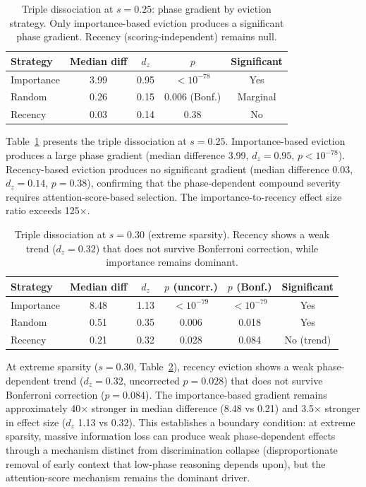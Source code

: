 \documentclass[11pt,a4paper]{article}
\begin{document}
\begin{table}[t]
\centering
\caption{Triple dissociation at $s=0.25$: phase gradient by eviction strategy. Only importance-based eviction produces a significant phase gradient. Recency (scoring-independent) remains null.}
\label{tab:triple_s025}
\begin{tabular}{lcccc}
\toprule
Strategy & Median diff & $d_z$ & $p$ & Significant \\
\midrule
Importance & 3.99 & 0.95 & $<10^{-78}$ & Yes \\
Random & 0.26 & 0.15 & 0.006 (Bonf.) & Marginal \\
Recency & 0.03 & 0.14 & 0.38 & No \\
\bottomrule
\end{tabular}
\end{table}

Table~\ref{tab:triple_s025} presents the triple dissociation at $s=0.25$. Importance-based eviction produces a large phase gradient (median difference 3.99, $d_z=0.95$, $p<10^{-78}$). Recency-based eviction produces no significant gradient (median difference 0.03, $d_z=0.14$, $p=0.38$), confirming that the phase-dependent compound severity requires attention-score-based selection. The importance-to-recency effect size ratio exceeds 125$\times$.

\begin{table}[t]
\centering
\caption{Triple dissociation at $s=0.30$ (extreme sparsity). Recency shows a weak trend ($d_z=0.32$) that does not survive Bonferroni correction, while importance remains dominant.}
\label{tab:triple_s030}
\begin{tabular}{lccccc}
\toprule
Strategy & Median diff & $d_z$ & $p$ (uncorr.) & $p$ (Bonf.) & Significant \\
\midrule
Importance & 8.48 & 1.13 & $<10^{-79}$ & $<10^{-79}$ & Yes \\
Random & 0.51 & 0.35 & 0.006 & 0.018 & Yes \\
Recency & 0.21 & 0.32 & 0.028 & 0.084 & No (trend) \\
\bottomrule
\end{tabular}
\end{table}

At extreme sparsity ($s=0.30$, Table~\ref{tab:triple_s030}), recency eviction shows a weak phase-dependent trend ($d_z=0.32$, uncorrected $p=0.028$) that does not survive Bonferroni correction ($p=0.084$). The importance-based gradient remains approximately 40$\times$ stronger in median difference (8.48 vs 0.21) and 3.5$\times$ stronger in effect size ($d_z$ 1.13 vs 0.32). This establishes a boundary condition: at extreme sparsity, massive information loss can produce weak phase-dependent effects through a mechanism distinct from discrimination collapse (disproportionate removal of early context that low-phase reasoning depends upon), but the attention-score mechanism remains the dominant driver.
\end{document}
